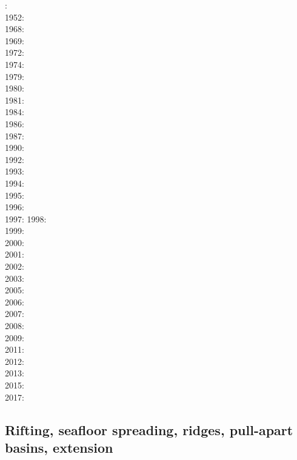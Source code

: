 : \cite{druc51}\cite{hafn51}\\
1952: \cite{drpr52}\\
1968: \cite{byer68}\\
1969: \cite{hand69}\\
1972: \cite{carr72}\\
1974: \cite{kogo74}\\
1979: \cite{goev79}\cite{evgo79}\\
1980: \cite{brko80}\\
1981: \cite{delo81}\\
1984: \cite{rafi84}\cite{chpa84}\cite{vede84}\\
1986: \cite{kapf86}\\
1987: \cite{kikr87}\\
1990: \cite{wica90}\\
1992: \cite{bako92}\cite{chbo92}\cite{kali92}\cite{kohl92}\\
1993: \cite{kawu93}\\
1994: \cite{fran94}\\
1995: \cite{koem95}\cite{gltu95}\\
1996: \cite{wasd96}\cite{hiko96}\\
1997: \cite{eshe97a,eshe97b}
1998: \cite{copo98}\cite{mazk98}\\
1999: \cite{kayk99}\\
2000: \cite{rydr00}\cite{rana00}\cite{meko00a,meko00b}\\
2001: \cite{lova01}\\
2002: \cite{hirt02}\\
2003: \cite{hiko03}\cite{kaju03}\cite{mohi03}\\
2005: \cite{didr05}\cite{drur05}\\
2006: \cite{rygw06}\cite{buwa06}\cite{momu06}\\
2007: \cite{hirw07}\cite{kohl07}\cite{faja07}\\
2008: \cite{lemm08}\cite{budr08}\cite{koka08}\cite{gird08}\\
2009: \cite{kayk09}\cite{kako09}\\
2011: \cite{lell11}\cite{kemk11}\\
2012: \cite{reyn12}\\
2013: \cite{lepo13}\cite{miam13}\\
2015: \cite{chpe15}\\
2017: \cite{bocc17}

\subsection*{Rifting, seafloor spreading, ridges, pull-apart basins, extension}
  

